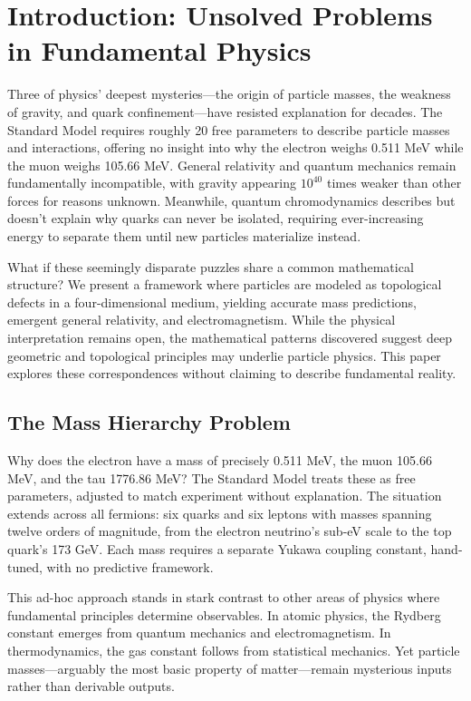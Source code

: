 \section{Introduction: Unsolved Problems in Fundamental Physics}

Three of physics' deepest mysteries---the origin of particle masses, the weakness of gravity, and quark confinement---have resisted explanation for decades. The Standard Model requires roughly 20 free parameters to describe particle masses and interactions, offering no insight into why the electron weighs 0.511 MeV while the muon weighs 105.66 MeV. General relativity and quantum mechanics remain fundamentally incompatible, with gravity appearing $10^{40}$ times weaker than other forces for reasons unknown. Meanwhile, quantum chromodynamics describes but doesn't explain why quarks can never be isolated, requiring ever-increasing energy to separate them until new particles materialize instead.

What if these seemingly disparate puzzles share a common mathematical structure? We present a framework where particles are modeled as topological defects in a four-dimensional medium, yielding accurate mass predictions, emergent general relativity, and electromagnetism. While the physical interpretation remains open, the mathematical patterns discovered suggest deep geometric and topological principles may underlie particle physics. This paper explores these correspondences without claiming to describe fundamental reality.


\subsection{The Mass Hierarchy Problem}

Why does the electron have a mass of precisely 0.511 MeV, the muon 105.66 MeV, and the tau 1776.86 MeV? The Standard Model treats these as free parameters, adjusted to match experiment without explanation. The situation extends across all fermions: six quarks and six leptons with masses spanning twelve orders of magnitude, from the electron neutrino's sub-eV scale to the top quark's 173 GeV. Each mass requires a separate Yukawa coupling constant, hand-tuned, with no predictive framework.

This ad-hoc approach stands in stark contrast to other areas of physics where fundamental principles determine observables. In atomic physics, the Rydberg constant emerges from quantum mechanics and electromagnetism. In thermodynamics, the gas constant follows from statistical mechanics. Yet particle masses---arguably the most basic property of matter---remain mysterious inputs rather than derivable outputs.

